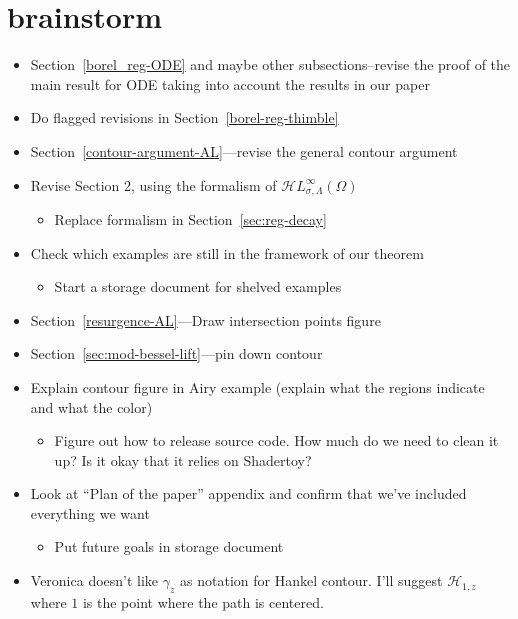 \documentclass{article}
\newcommand{\singexp}[2]{\mathcal{H}L^\infty_{#1, #2}}
\begin{document}
\section{brainstorm}
\begin{itemize}
    \item Section~\ref{borel_reg-ODE} and maybe other subsections--revise the proof of the main result for ODE taking into account the results in our paper
    \item Do flagged revisions in Section~\ref{borel-reg-thimble}
    \item Section~\ref{contour-argument-AL}---revise the general contour argument
    \item Revise Section 2, using the formalism of $\singexp{\sigma}{\Lambda}(\Omega)$
    \begin{itemize}
    \item Replace formalism in Section~\ref{sec:reg-decay}
    \end{itemize}
    \item Check which examples are still in the framework of our theorem
    \begin{itemize}
    \item Start a storage document for shelved examples
    \end{itemize}
    \item Section~\ref{resurgence-AL}---Draw intersection points figure
    \item Section~\ref{sec:mod-bessel-lift}---pin down contour
    \item Explain contour figure in Airy example (explain what the regions indicate and what the color)
    \begin{itemize}
    \item Figure out how to release source code. How much do we need to clean it up? Is it okay that it relies on Shadertoy?
    \end{itemize}
    \item Look at ``Plan of the paper'' appendix and confirm that we've included everything we want
    \begin{itemize}
    \item Put future goals in storage document
    \end{itemize}
    \item Veronica doesn't like $\gamma_z$ as notation for Hankel contour. I'll suggest $\mathcal{H}_{1,z}$ where $1$ is the point where the path is centered. 
\end{itemize}
\end{document}
